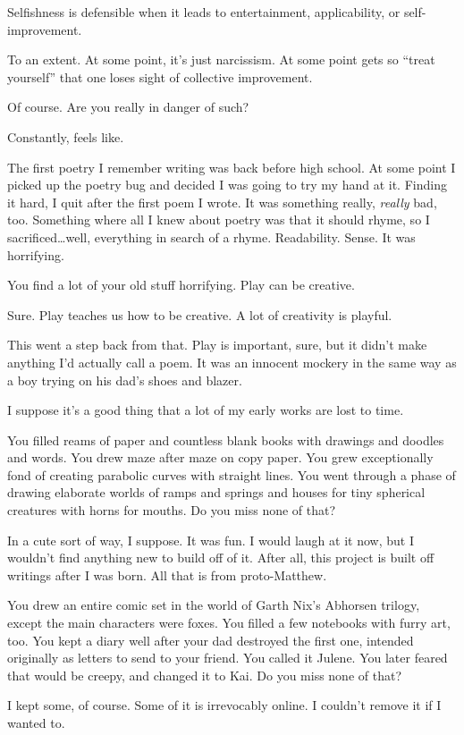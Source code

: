 \begin{ally}
Selfishness is defensible when it leads to entertainment, applicability, or self-improvement.
\end{ally}
To an extent. At some point, it's just narcissism. At some point gets so ``treat yourself'' that one loses sight of collective improvement.

\begin{ally}
Of course. Are you really in danger of such?
\end{ally}
Constantly, feels like.
\newpage

\noindent The first poetry I remember writing was back before high school. At some point I picked up the poetry bug and decided I was going to try my hand at it. Finding it hard, I quit after the first poem I wrote. It was something really, \emph{really} bad, too. Something where all I knew about poetry was that it should rhyme, so I sacrificed\ldots{}well, everything in search of a rhyme. Readability. Sense. It was horrifying.

\begin{ally}
You find a lot of your old stuff horrifying. Play can be creative.
\end{ally}
Sure. Play teaches us how to be creative. A lot of creativity is playful.

This went a step back from that. Play is important, sure, but it didn't make anything I'd actually call a poem. It was an innocent mockery in the same way as a boy trying on his dad's shoes and blazer.

I suppose it's a good thing that a lot of my early works are lost to time.

\begin{ally}
You filled reams of paper and countless blank books with drawings and doodles and words. You drew maze after maze on copy paper. You grew exceptionally fond of creating parabolic curves with straight lines. You went through a phase of drawing elaborate worlds of ramps and springs and houses for tiny spherical creatures with horns for mouths. Do you miss none of that?
\end{ally}
In a cute sort of way, I suppose. It was fun. I would laugh at it now, but I wouldn't find anything new to build off of it. After all, this project is built off writings after I was born. All that is from proto-Matthew.

\begin{ally}
You drew an entire comic set in the world of Garth Nix's Abhorsen trilogy, except the main characters were foxes. You filled a few notebooks with furry art, too. You kept a diary well after your dad destroyed the first one, intended originally as letters to send to your friend. You called it Julene. You later feared that would be creepy, and changed it to Kai. Do you miss none of that?
\end{ally}
I kept some, of course. Some of it is irrevocably online. I couldn't remove it if I wanted to.

